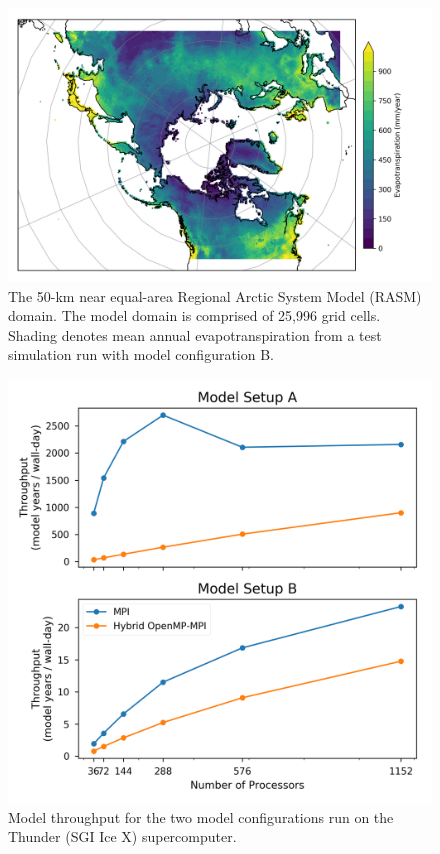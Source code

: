 \documentclass[gmd, manuscript]{copernicus}
\begin{document}
\clearpage
\begin{figure}[t]
\includegraphics[width=6in]{RASM_domain_fig.png}
\caption{The 50-km near equal-area Regional Arctic System Model (RASM) domain. The model domain is comprised of 25,996 grid cells. Shading denotes mean annual evapotranspiration from a test simulation run with model configuration B.}
\label{fig:vic_domain}
\end{figure}

\clearpage
\begin{figure}[t]
\includegraphics[width=6in]{VIC_scaling.png}
\caption{Model throughput for the two model configurations run on the Thunder (SGI Ice X) supercomputer.}
\label{fig:vic_scaling}
\end{figure}
\end{document}
